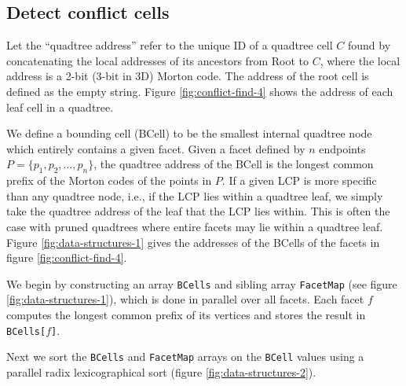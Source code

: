 \documentclass[final,3p,times,twocolumn]{elsarticle}
\begin{document}
\subsection{Detect conflict cells}

Let the ``quadtree address'' refer to the unique ID of a quadtree cell $C$ found by concatenating the local addresses of its ancestors from Root to $C$, where the local address is a 2-bit (3-bit in 3D) Morton code. The address of the root cell is defined as the empty string. Figure \ref{fig:conflict-find-4} shows the address of each leaf cell in a quadtree.

We define a bounding cell (BCell) to be the smallest internal quadtree node which entirely contains a given facet. Given a facet defined by $n$ endpoints $P=\{p_1, p_2, \dots, p_n\}$, the quadtree address of the BCell is the longest common prefix of the Morton codes of the points in $P$. If a given LCP is more specific than any quadtree node, i.e., if the LCP lies within a quadtree leaf, we simply take the quadtree address of the leaf that the LCP lies within. This is often the case with pruned quadtrees where entire facets may lie within a quadtree leaf.  Figure \ref{fig:data-structures-1} gives the addresses of the BCells of the facets in figure \ref{fig:conflict-find-4}.

We begin by constructing an array \texttt{BCells} and sibling array \texttt{FacetMap} (see figure \ref{fig:data-structures-1}), which is done in parallel over all facets. Each facet $f$ computes the longest common prefix of its vertices and stores the result in \texttt{BCells[$f$]}.

Next we sort the \texttt{BCells} and \texttt{FacetMap} arrays on the \texttt{BCell} values using a parallel radix lexicographical sort (figure \ref{fig:data-structures-2}).%
\end{document}
